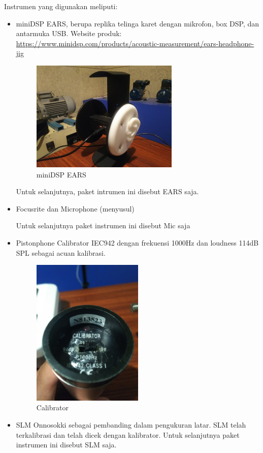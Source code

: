 \documentclass[12pt,]{article}
\begin{document}
	Instrumen yang digunakan meliputi:
	\begin{itemize}
		\item miniDSP EARS, berupa replika telinga karet dengan mikrofon, box DSP, dan antarmuka USB.
		Website produk:\\
		\url{https://www.minidsp.com/products/acoustic-measurement/ears-headphone-jig}

		\begin{figure}[!ht]
			\centering
			\includegraphics[width=200pt]{images/ears}
			\caption{miniDSP EARS}
		\end{figure}

		Untuk selanjutnya, paket intrumen ini disebut EARS saja.

		\item Focusrite dan Microphone (menyusul)

		Untuk selanjutnya paket instrumen ini disebut Mic saja

		\item Pistonphone Calibrator IEC942 dengan frekuensi 1000Hz dan loudness 114dB SPL sebagai acuan kalibrasi.
		\begin{figure}[!ht]
			\centering
			\includegraphics[width=150pt]{images/calibrator}
			\caption{Calibrator}
		\end{figure}

		\item SLM Onnosokki sebagai pembanding dalam pengukuran latar.
		SLM telah terkalibrasi dan telah dicek dengan kalibrator.
		Untuk selanjutnya paket instrumen ini disebut SLM saja.


\end{itemize}
\end{document}
